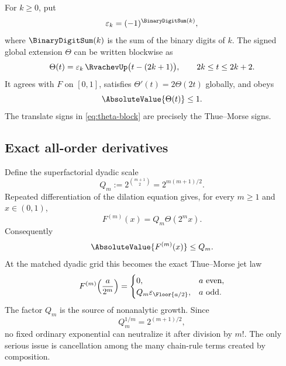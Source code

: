 \documentclass[11pt,oneside]{article}
\theoremstyle{definition}
\theoremstyle{remark}
\newcommand{\eps}{\varepsilon}
\newcommand{\ThetaF}{\Theta}
\begin{document}
For $k\geq0$, put
\begin{equation}
  \eps_k=(-1)^{\BinaryDigitSum(k)},
  \label{eq:tm-sign}
\end{equation}
where $\BinaryDigitSum(k)$ is the sum of the binary digits of $k$.  The signed global extension
$\ThetaF$ can be written blockwise as
\begin{equation}
 \ThetaF(t)=\eps_k\,\RvachevUp\bigl(t-(2k+1)\bigr),
 \qquad 2k\leq t\leq2k+2.
 \label{eq:theta-block}
\end{equation}
It agrees with $F$ on $[0,1]$, satisfies $\ThetaF'(t)=2\ThetaF(2t)$ globally, and obeys
\begin{equation}
 \AbsoluteValue{\ThetaF(t)}\leq1.
 \label{eq:theta-bound}
\end{equation}
The translate signs in \eqref{eq:theta-block} are precisely the Thue--Morse signs.

\subsection{Exact all-order derivatives}

Define the superfactorial dyadic scale
\begin{equation}
  Q_m:=2^{\binom{m+1}{2}}=2^{m(m+1)/2}.
  \label{eq:Qm}
\end{equation}
Repeated differentiation of the dilation equation gives, for every $m\geq1$ and
$x\in(0,1)$,
\begin{equation}
  F^{(m)}(x)=Q_m\ThetaF(2^m x).
  \label{eq:derivative-atlas}
\end{equation}
Consequently
\begin{equation}
  \AbsoluteValue{F^{(m)}(x)}\leq Q_m.
  \label{eq:F-derivative-bound}
\end{equation}
At the matched dyadic grid this becomes the exact Thue--Morse jet law
\begin{equation}
 F^{(m)}\!\left(\frac{a}{2^m}\right)
 =\begin{cases}
 0,&a\text{ even},\\
 Q_m\eps_{\Floor{a/2}},&a\text{ odd}.
 \end{cases}
 \label{eq:dyadic-jet}
\end{equation}
The factor $Q_m$ is the source of nonanalytic growth.  Since
\begin{equation}
  Q_m^{1/m}=2^{(m+1)/2},
  \label{eq:Q-root}
\end{equation}
no fixed ordinary exponential can neutralize it after division by $m!$.
The only serious issue is cancellation among the many chain-rule terms created by
composition.
\end{document}
